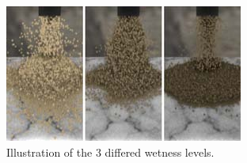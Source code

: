\begin{figure}[htb]
	\centering
	\includegraphics[width=\linewidth]{RSKN08/wetsandtypes.jpg}
	\caption{Illustration of the 3 differed wetness levels.}
	\label{fig:wetsandtypes}
\end{figure}